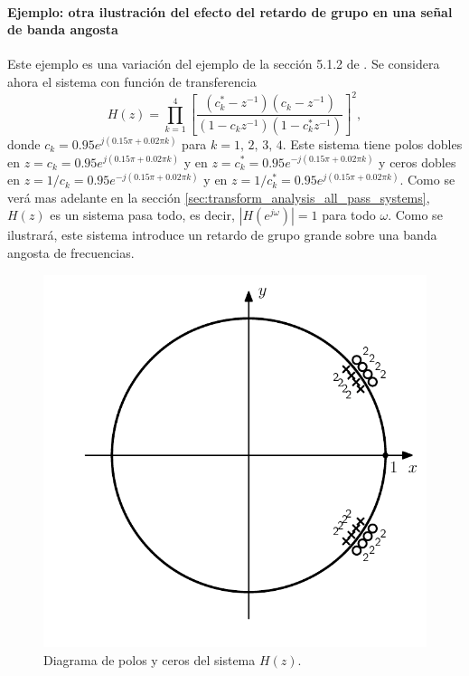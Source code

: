 \documentclass[a4paper]{report}
\begin{document}
\paragraph{Ejemplo: otra ilustración del efecto del retardo de grupo en una señal de banda angosta} Este ejemplo es una variación del ejemplo de la sección 5.1.2 de \cite{oppenheim2009discrete}. Se considera ahora el sistema con función de transferencia
\begin{equation}\label{eq:transform_analysis_example_5_1_2_system_function}
 H(z)=\prod_{k=1}^4\left[\frac{(c^*_k-z^{-1})(c_k-z^{-1})}{(1-c_kz^{-1})(1-c^*_kz^{-1})}\right]^2, 
\end{equation}
donde \(c_k=0.95e^{j(0.15\pi+0.02\pi k)}\) para \(k=1,\,2,\,3,\,4\). Este sistema tiene polos dobles en \(z=c_k=0.95e^{j(0.15\pi+0.02\pi k)}\) y en \(z=c^*_k=0.95e^{-j(0.15\pi+0.02\pi k)}\) y ceros dobles en \(z=1/c_k=0.95e^{-j(0.15\pi+0.02\pi k)}\) y en \(z=1/c^*_k=0.95e^{j(0.15\pi+0.02\pi k)}\). Como se verá mas adelante en la sección \ref{sec:transform_analysis_all_pass_systems}, \(H(z)\) es un sistema pasa todo, es decir, \(|H(e^{j\omega})|=1\) para todo \(\omega\). Como se ilustrará, este sistema introduce un retardo de grupo grande sobre una banda angosta de frecuencias.
 \begin{figure}[!htb]
  \begin{minipage}[c]{0.53\textwidth}
    \includegraphics[width=\textwidth]{figuras/transform_analysis_example_5_1_2_group_delay_poles_zeros_plot.pdf}
  \end{minipage}\hfill
  \begin{minipage}[c]{0.38\textwidth}
    \caption{
     Diagrama de polos y ceros del sistema \(H(z)\).
    }\label{fig:transform_analysis_example_5_1_2_group_delay_poles_zeros_plot}
  \end{minipage}
\end{figure}
\end{document}
